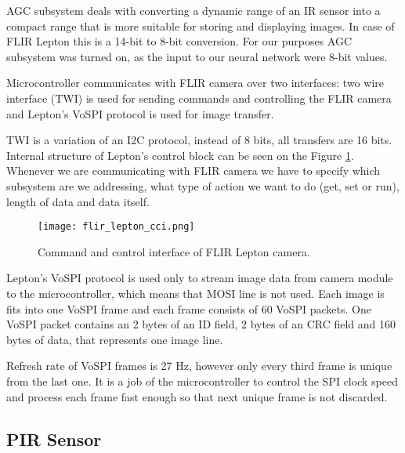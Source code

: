 AGC subsystem deals with converting a dynamic range of an IR sensor into a compact range that is more suitable for storing and displaying images.
In case of FLIR Lepton this is a 14-bit to 8-bit conversion.
For our purposes AGC subsystem was turned on, as the input to our neural network were 8-bit values.

Microcontroller communicates with FLIR camera over two interfaces: two wire interface (TWI) is used for sending commands and controlling the FLIR camera and Lepton's VoSPI protocol is used for image transfer.

TWI is a variation of an I2C protocol, instead of 8 bits, all transfers are 16 bits.
Internal structure of Lepton's control block can be seen on the Figure \ref{flir_lepton_cci}.
Whenever we are communicating with FLIR camera we have to specify which subsystem are we addressing, what type of action we want to do (get, set or run), length of data and data itself.

\begin{figure}[ht]
        \centering
        \texttt{[image: flir\_lepton\_cci.png]} 
        \caption{ Command and control interface of FLIR Lepton camera.} 
        \label{flir_lepton_cci}
\end{figure}

Lepton's VoSPI protocol is used only to stream image data from camera module to the microcontroller, which means that MOSI line is not used.
Each image is fits into one VoSPI frame and each frame consists of 60 VoSPI packets.
One VoSPI packet contains an 2 bytes of an ID field, 2 bytes of an CRC field and 160 bytes of data\footnotemark, that represents one image line.

Refresh rate of VoSPI frames is 27 \si{\hertz}, however only every third frame is unique from the last one.
It is a job of the microcontroller to control the SPI clock speed and process each frame fast enough so that next unique frame is not discarded.


\subsection{ PIR Sensor}

